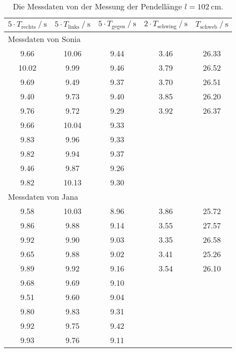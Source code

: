   \begin{table}
    \centering
    \caption{Die Messdaten von der Messung der Pendellänge $l = \SI{102}{\centi\metre}$.}
    \label{tab:102cm}
    \begin{tabular}{c c c c c}
      \toprule
      $ 5 \cdot T_{\text{rechts}} \mathbin{/} \si{\second} $ & $ 5 \cdot T_{\text{links}} \mathbin{/} \si{\second} $ & $ 5 \cdot T_{\text{gegen}} \mathbin{/} \si{\second} $ &
      $ 2 \cdot T_{\text{schwing}} \mathbin{/} \si{\second} $ & $ T_{\text{schweb}} \mathbin{/} \si{\second} $\\
      \midrule
      \multicolumn{5}{l}{Messdaten von Sonia}\\
      \midrule
      9.66  &   10.06 &  9.44 &   3.46 &   26.33  \\
      10.02 &   9.99  &  9.46 &   3.79 &   26.52  \\
      9.69  &   9.49  &  9.37 &   3.70 &   26.51  \\
      9.40  &   9.73  &  9.40 &   3.85 &   26.20  \\
      9.76  &   9.72  &  9.29 &   3.92 &   26.37  \\
      9.66  &   10.04 &  9.33 &        &          \\
      9.83  &   9.96  &  9.33 &        &          \\
      9.82  &   9.94  &  9.37 &        &          \\
      9.46  &   9.87  &  9.26 &        &          \\
      9.82  &   10.13 &  9.30 &        &          \\
      \midrule
      \multicolumn{5}{l}{Messdaten von Jana}\\
      \midrule
      9.58  &   10.03 &  8.96 &   3.86 &   25.72  \\
      9.86  &   9.88  &  9.14 &   3.55 &   27.57  \\
      9.92  &   9.90  &  9.03 &   3.35 &   26.58  \\
      9.65  &   9.88  &  9.02 &   3.41 &   25.26  \\
      9.89  &   9.92  &  9.16 &   3.54 &   26.10  \\
      9.68  &   9.69  &  9.10 &        &          \\
      9.51  &   9.60  &  9.04 &        &          \\
      9.80  &   9.83  &  9.31 &        &          \\
      9.92  &   9.75  &  9.42 &        &          \\
      9.93  &   9.76  &  9.11 &        &          \\
      \bottomrule
    \end{tabular}
  \end{table}

